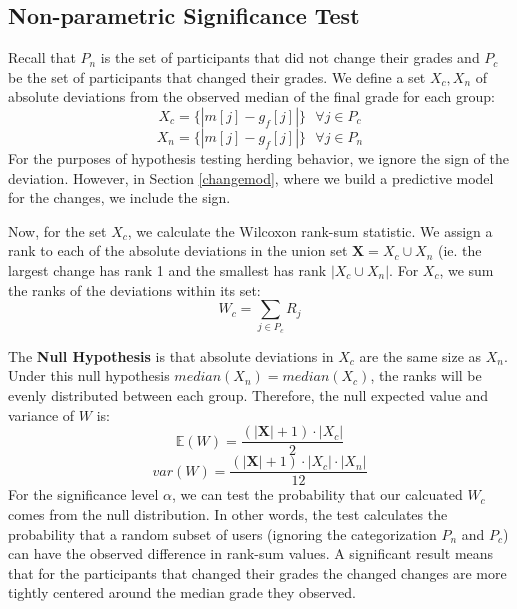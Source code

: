 \subsection{Non-parametric Significance Test}
Recall that $P_n$ is the set of participants that did not change their grades and $P_c$ be the set of participants that changed their grades.
We define a set $X_c,X_n$ of absolute deviations from the observed median of the final grade for each group:
\begin{equation}
X_c = \{|m[j] - g_f[j]|\}\text{ }\forall j \in P_c
\end{equation}
\begin{equation}
X_n = \{|m[j] - g_f[j]|\}\text{ }\forall j \in P_n
\end{equation}
For the purposes of hypothesis testing herding behavior, we ignore the sign of the deviation.
However, in Section \ref{changemod}, where we build a predictive model for the changes, we include the sign.

Now, for the set $X_c$, we calculate the Wilcoxon rank-sum statistic.
We assign a rank to each of the absolute deviations in the union set $\textbf{X} = X_c \cup X_n$ (ie. the largest change has rank 1 and the smallest has rank $|X_c \cup X_n|$.
For $X_c$, we sum the ranks of the deviations within its set:
\begin{equation}
W_c = \sum_{j \in P_c} R_j
\end{equation}

The \textbf{Null Hypothesis} is that absolute deviations in $X_c$ are the same size as $X_n$. 
Under this null hypothesis $median(X_n) = median(X_c)$, the ranks will be evenly distributed between each group. 
Therefore, the null expected value and variance of $W$ is:
\begin{equation}
\mathbb{E}(W) = \frac{(|\textbf{X}| + 1)\cdot |X_c|}{2}
\end{equation}
\begin{equation}
var(W) = \frac{(|\textbf{X}| + 1)\cdot |X_c| \cdot |X_n|}{12}
\end{equation}
For the significance level $\alpha$, we can test the probability that our calcuated $W_c$ comes from the null distribution.
In other words, the test calculates the probability that a random subset of users (ignoring the categorization $P_n$ and $P_c$) can have the observed difference in rank-sum values.
A significant result means that for the participants that changed their grades the changed changes are more tightly centered around the median grade they observed.

